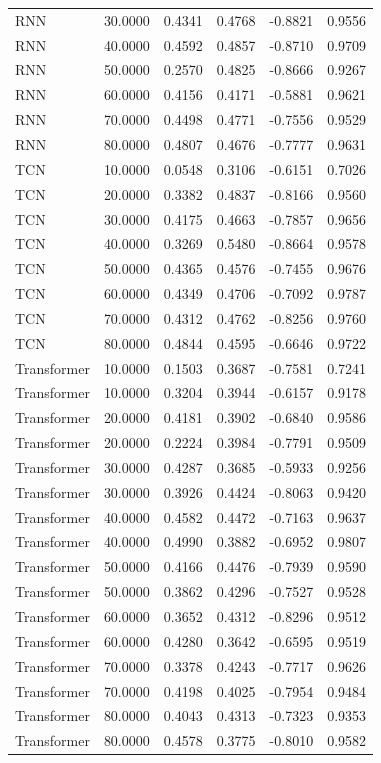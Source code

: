 \begin{tabular}{lrrrrr}
RNN & 30.0000 & 0.4341 & 0.4768 & -0.8821 & 0.9556 \\
RNN & 40.0000 & 0.4592 & 0.4857 & -0.8710 & 0.9709 \\
RNN & 50.0000 & 0.2570 & 0.4825 & -0.8666 & 0.9267 \\
RNN & 60.0000 & 0.4156 & 0.4171 & -0.5881 & 0.9621 \\
RNN & 70.0000 & 0.4498 & 0.4771 & -0.7556 & 0.9529 \\
RNN & 80.0000 & 0.4807 & 0.4676 & -0.7777 & 0.9631 \\
TCN & 10.0000 & 0.0548 & 0.3106 & -0.6151 & 0.7026 \\
TCN & 20.0000 & 0.3382 & 0.4837 & -0.8166 & 0.9560 \\
TCN & 30.0000 & 0.4175 & 0.4663 & -0.7857 & 0.9656 \\
TCN & 40.0000 & 0.3269 & 0.5480 & -0.8664 & 0.9578 \\
TCN & 50.0000 & 0.4365 & 0.4576 & -0.7455 & 0.9676 \\
TCN & 60.0000 & 0.4349 & 0.4706 & -0.7092 & 0.9787 \\
TCN & 70.0000 & 0.4312 & 0.4762 & -0.8256 & 0.9760 \\
TCN & 80.0000 & 0.4844 & 0.4595 & -0.6646 & 0.9722 \\
Transformer & 10.0000 & 0.1503 & 0.3687 & -0.7581 & 0.7241 \\
Transformer & 10.0000 & 0.3204 & 0.3944 & -0.6157 & 0.9178 \\
Transformer & 20.0000 & 0.4181 & 0.3902 & -0.6840 & 0.9586 \\
Transformer & 20.0000 & 0.2224 & 0.3984 & -0.7791 & 0.9509 \\
Transformer & 30.0000 & 0.4287 & 0.3685 & -0.5933 & 0.9256 \\
Transformer & 30.0000 & 0.3926 & 0.4424 & -0.8063 & 0.9420 \\
Transformer & 40.0000 & 0.4582 & 0.4472 & -0.7163 & 0.9637 \\
Transformer & 40.0000 & 0.4990 & 0.3882 & -0.6952 & 0.9807 \\
Transformer & 50.0000 & 0.4166 & 0.4476 & -0.7939 & 0.9590 \\
Transformer & 50.0000 & 0.3862 & 0.4296 & -0.7527 & 0.9528 \\
Transformer & 60.0000 & 0.3652 & 0.4312 & -0.8296 & 0.9512 \\
Transformer & 60.0000 & 0.4280 & 0.3642 & -0.6595 & 0.9519 \\
Transformer & 70.0000 & 0.3378 & 0.4243 & -0.7717 & 0.9626 \\
Transformer & 70.0000 & 0.4198 & 0.4025 & -0.7954 & 0.9484 \\
Transformer & 80.0000 & 0.4043 & 0.4313 & -0.7323 & 0.9353 \\
Transformer & 80.0000 & 0.4578 & 0.3775 & -0.8010 & 0.9582 \\
\bottomrule
\end{tabular}
